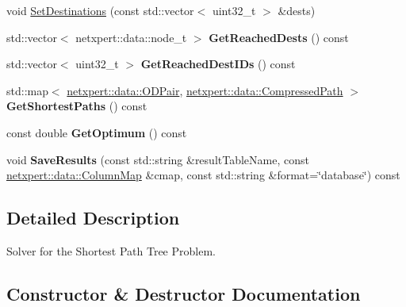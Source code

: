 \begin{DoxyCompactItemize}
\item 
void \hyperlink{classnetxpert_1_1ShortestPathTree_a9fe7e9de16da3589962ddc1e16838691}{Set\+Destinations} (const std\+::vector$<$ uint32\+\_\+t $>$ \&dests)
\item 
std\+::vector$<$ netxpert\+::data\+::node\+\_\+t $>$ {\bfseries Get\+Reached\+Dests} () const \hypertarget{classnetxpert_1_1ShortestPathTree_a5793c2237688107aaedefeeff33af23c}{}\label{classnetxpert_1_1ShortestPathTree_a5793c2237688107aaedefeeff33af23c}

\item 
std\+::vector$<$ uint32\+\_\+t $>$ {\bfseries Get\+Reached\+Dest\+I\+Ds} () const \hypertarget{classnetxpert_1_1ShortestPathTree_ab54e89b59509c274de60ff91fd46d72a}{}\label{classnetxpert_1_1ShortestPathTree_ab54e89b59509c274de60ff91fd46d72a}

\item 
std\+::map$<$ \hyperlink{structnetxpert_1_1data_1_1ODPair}{netxpert\+::data\+::\+O\+D\+Pair}, \hyperlink{namespacenetxpert_1_1data_a82e488b55f222a9759d73e24f6087033}{netxpert\+::data\+::\+Compressed\+Path} $>$ {\bfseries Get\+Shortest\+Paths} () const \hypertarget{classnetxpert_1_1ShortestPathTree_a12d052cbd1d363f93671aae69ac506a6}{}\label{classnetxpert_1_1ShortestPathTree_a12d052cbd1d363f93671aae69ac506a6}

\item 
const double {\bfseries Get\+Optimum} () const \hypertarget{classnetxpert_1_1ShortestPathTree_a3907e625165ffa6492f8815099edc379}{}\label{classnetxpert_1_1ShortestPathTree_a3907e625165ffa6492f8815099edc379}

\item 
void {\bfseries Save\+Results} (const std\+::string \&result\+Table\+Name, const \hyperlink{structnetxpert_1_1data_1_1ColumnMap}{netxpert\+::data\+::\+Column\+Map} \&cmap, const std\+::string \&format=\char`\"{}database\char`\"{}) const \hypertarget{classnetxpert_1_1ShortestPathTree_a5c110d69c62241ad934d50bbf36d8325}{}\label{classnetxpert_1_1ShortestPathTree_a5c110d69c62241ad934d50bbf36d8325}

\end{DoxyCompactItemize}


\subsection{Detailed Description}
Solver for the Shortest Path Tree Problem. 

\subsection{Constructor \& Destructor Documentation}
